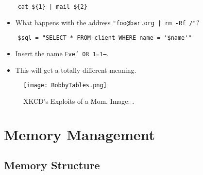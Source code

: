 %


\begin{frame}[fragile]
  \begin{verbatim}
    cat ${1} | mail ${2}
  \end{verbatim}
  \begin{itemize}
    \item What happens with the address
      \texttt{"foo@bar.org | rm -Rf /"}?
  \end{itemize}
\end{frame}


\begin{frame}[fragile]
  \begin{verbatim}
    $sql = "SELECT * FROM client WHERE name = '$name'"
  \end{verbatim}
  \begin{itemize}
    \item Insert the name \texttt{Eve' OR 1=1--}.
    \item This will get a totally different meaning.
  \end{itemize}
\end{frame}

\begin{frame}
  \begin{figure}
    \centering
    \texttt{[image: BobbyTables.png]}
    \caption{%
      XKCD's Exploits of a Mom.
      Image: \cite{BobbyTables}.
    }
  \end{figure}
\end{frame}


\section{Memory Management}

\subsection{Memory Structure}

